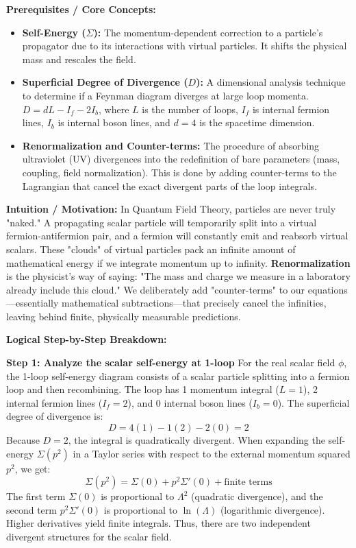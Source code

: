 \begin{solution}
\textbf{Prerequisites / Core Concepts:}
\begin{itemize}
    \item \textbf{Self-Energy ($\Sigma$):} The momentum-dependent correction to a particle's propagator due to its interactions with virtual particles. It shifts the physical mass and rescales the field.
    \item \textbf{Superficial Degree of Divergence ($D$):} A dimensional analysis technique to determine if a Feynman diagram diverges at large loop momenta. $D = dL - I_f - 2I_b$, where $L$ is the number of loops, $I_f$ is internal fermion lines, $I_b$ is internal boson lines, and $d=4$ is the spacetime dimension.
    \item \textbf{Renormalization and Counter-terms:} The procedure of absorbing ultraviolet (UV) divergences into the redefinition of bare parameters (mass, coupling, field normalization). This is done by adding counter-terms to the Lagrangian that cancel the exact divergent parts of the loop integrals.
\end{itemize}

\textbf{Intuition / Motivation:}
In Quantum Field Theory, particles are never truly "naked." A propagating scalar particle will temporarily split into a virtual fermion-antifermion pair, and a fermion will constantly emit and reabsorb virtual scalars. These "clouds" of virtual particles pack an infinite amount of mathematical energy if we integrate momentum up to infinity. \textbf{Renormalization} is the physicist's way of saying: "The mass and charge we measure in a laboratory already include this cloud." We deliberately add "counter-terms" to our equations—essentially mathematical subtractions—that precisely cancel the infinities, leaving behind finite, physically measurable predictions.

\textbf{Logical Step-by-Step Breakdown:}

\textbf{Step 1: Analyze the scalar self-energy at 1-loop}
For the real scalar field $\phi$, the 1-loop self-energy diagram consists of a scalar particle splitting into a fermion loop and then recombining.
The loop has 1 momentum integral ($L=1$), 2 internal fermion lines ($I_f = 2$), and 0 internal boson lines ($I_b = 0$).
The superficial degree of divergence is:
\[ D = 4(1) - 1(2) - 2(0) = 2 \]
Because $D = 2$, the integral is quadratically divergent. When expanding the self-energy $\Sigma(p^2)$ in a Taylor series with respect to the external momentum squared $p^2$, we get:
\[ \Sigma(p^2) = \Sigma(0) + p^2 \Sigma'(0) + \text{finite terms} \]
The first term $\Sigma(0)$ is proportional to $\Lambda^2$ (quadratic divergence), and the second term $p^2 \Sigma'(0)$ is proportional to $\ln(\Lambda)$ (logarithmic divergence). Higher derivatives yield finite integrals.
Thus, there are two independent divergent structures for the scalar field.


\end{solution}
